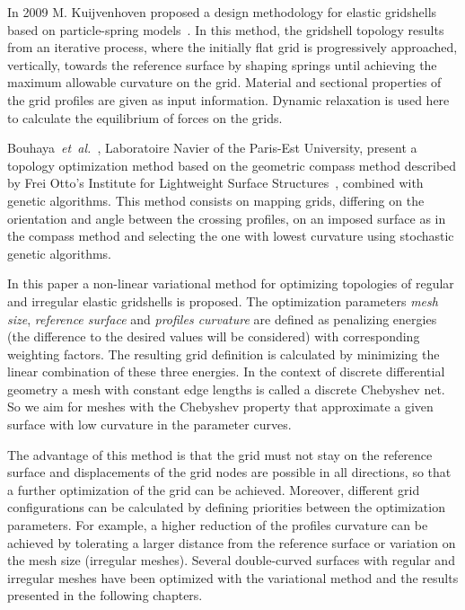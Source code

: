 \documentclass[Thesis.tex]{subfiles}
\begin{document}
In 2009 M. Kuijvenhoven proposed a design methodology for elastic gridshells based on particle-spring models~\cite{Kuijvenhoven2009}. In this method, the gridshell topology results from an iterative process, where the initially flat grid is progressively approached, vertically, towards the reference surface by shaping springs until achieving the maximum allowable curvature on the grid. Material and sectional properties of the grid profiles are given as input information. Dynamic relaxation is used here to calculate the equilibrium of forces on the grids. 

Bouhaya~\emph{et~al.}~\cite{BouhayaBC2011}, Laboratoire Navier of the Paris-Est University, present a topology optimization method based on the geometric compass method described by Frei Otto's Institute for Lightweight Surface Structures~\cite{IL1974}, combined with genetic algorithms. This method consists on mapping grids, differing on the orientation and angle between the crossing profiles, on an imposed surface as in the compass method and selecting the one with lowest curvature using stochastic genetic algorithms.

In this paper a non-linear variational method for optimizing topologies of regular and irregular elastic gridshells is proposed. The optimization parameters {\it mesh size}, {\it reference surface} and {\it profiles curvature} are defined as penalizing energies (the difference to the desired values will be considered) with corresponding weighting factors. The resulting grid definition is calculated by minimizing the linear combination of these three energies. In the context of discrete differential geometry a mesh with constant edge lengths is called a discrete Chebyshev net. So we aim for meshes with the Chebyshev property that approximate a given surface with low curvature in the parameter curves. 

The advantage of this method is that the grid must not stay on the reference surface and displacements of the grid nodes are possible in all directions, so that a further optimization of the grid can be achieved. Moreover, different grid configurations can be calculated by defining priorities between the optimization parameters. For example, a higher reduction of the profiles curvature can be achieved by tolerating a larger distance from the reference surface or variation on the mesh size (irregular meshes). Several double-curved surfaces with regular and irregular meshes have been optimized with the variational method and the results presented in the following chapters.
\end{document}
